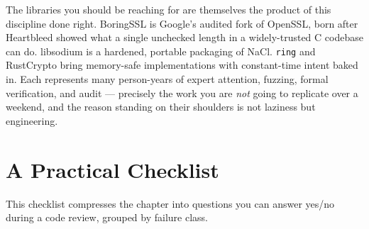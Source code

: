 \begin{applicationbox}
The libraries you should be reaching for are themselves the product of this
discipline done right. BoringSSL is Google's audited fork of OpenSSL, born after
Heartbleed showed what a single unchecked length in a widely-trusted C codebase can
do. libsodium is a hardened, portable packaging of NaCl. \texttt{ring} and RustCrypto bring
memory-safe implementations with constant-time intent baked in. Each represents
many person-years of expert attention, fuzzing, formal verification, and audit
--- precisely the work you are \emph{not} going to replicate over a weekend, and the
reason standing on their shoulders is not laziness but engineering.
\end{applicationbox}

\section{A Practical Checklist}
\label{ch39:checklist}

This checklist compresses the chapter into questions you can answer yes/no during a
code review, grouped by failure class.

